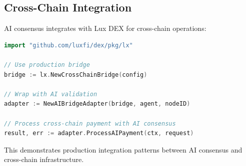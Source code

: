 \subsection{Cross-Chain Integration}

AI consensus integrates with Lux DEX for cross-chain operations:

\begin{lstlisting}[language=Go]
import "github.com/luxfi/dex/pkg/lx"

// Use production bridge
bridge := lx.NewCrossChainBridge(config)

// Wrap with AI validation
adapter := NewAIBridgeAdapter(bridge, agent, nodeID)

// Process cross-chain payment with AI consensus
result, err := adapter.ProcessAIPayment(ctx, request)
\end{lstlisting}

This demonstrates production integration patterns between AI consensus and cross-chain infrastructure.
